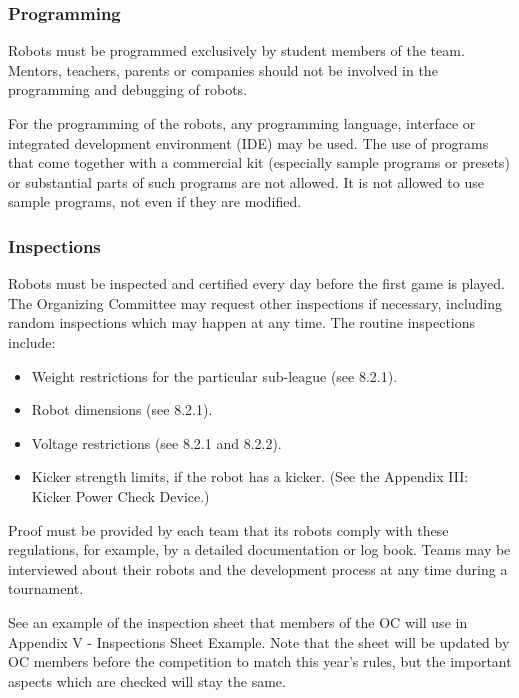 \documentclass{article}
\begin{document}
\subsubsection{Programming \label{ref-058}}

Robots must be programmed exclusively by student members of the team. Mentors, teachers, parents or companies should not be involved in the programming and debugging of robots.

For the programming of the robots, any programming language, interface or integrated development environment (IDE) may be used. The use of programs that come together with a commercial kit (especially sample programs or presets) or substantial parts of such programs are not allowed. It is not allowed to use sample programs, not even if they are modified.

\subsubsection{Inspections \label{ref-059}}

Robots must be inspected and certified every day before the first game is played. The Organizing Committee may request other inspections if necessary, including random inspections which may happen at any time. The routine inspections include:

\begin{itemize}
\item Weight restrictions for the particular sub-league (see 8.2.1).

\item Robot dimensions (see 8.2.1).

\item Voltage restrictions (see 8.2.1 and 8.2.2).

\item Kicker strength limits, if the robot has a kicker. (See the Appendix III: Kicker Power Check Device.)
\end{itemize}

Proof must be provided by each team that its robots comply with these regulations, for example, by a detailed documentation or log book. Teams may be interviewed about their robots and the development process at any time during a tournament.

See an example of the inspection sheet that members of the OC will use in Appendix V - Inspections Sheet Example. Note that the sheet will be updated by OC members before the competition to match this year's rules, but the important aspects which are checked will stay the same.
\end{document}
